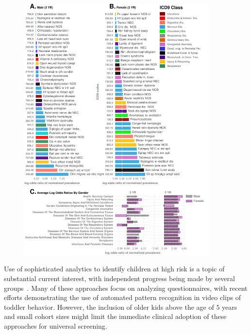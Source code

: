 \documentclass[onecolumn,10pt]{IEEEtran}
\begin{document}
\begin{figure}[!t]
\centering
  \includegraphics[width=0.9\textwidth]{comorbidA}
 
  \label{EXT-fig3}
\end{figure}

Use of sophisticated analytics to identify children at high risk is a topic of substantial current interest, with independent progress being made by several groups~\cite{hyde2019applications,abbas2020multi,duda2016clinical,duda2014testing,fusaro2014potential,wall2012use,wall2012use2}. Many of these approaches  focus on analyzing questionnaires, with recent efforts demonstrating the use of  automated pattern recognition in video clips of toddler behavior. However, the inclusion of older kids above the age of  $5$ years and  small cohort sizes might limit the immediate clinical adoption of these approaches for universal screening.
\end{document}
